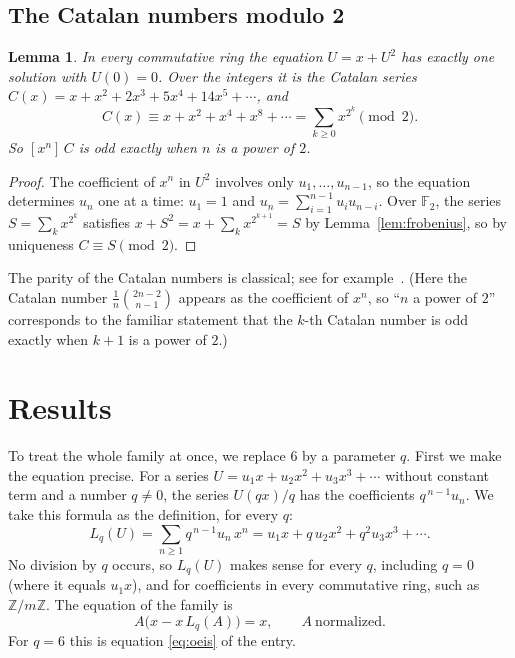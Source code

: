 \documentclass[11pt,a4paper]{article}
\newtheorem{lemma}[theorem]{Lemma}
\theoremstyle{definition}
\theoremstyle{remark}
\newcommand{\Z}{\mathbb{Z}}
\newcommand{\F}{\mathbb{F}}
\newcommand{\coeff}[2]{[x^{#1}]\,#2}
\begin{document}
\subsection{The Catalan numbers modulo 2}
\begin{lemma}\label{lem:catalan}
In every commutative ring the equation $U=x+U^2$ has exactly one solution with $U(0)=0$. Over the integers it is the
Catalan series $C(x)=x+x^2+2x^3+5x^4+14x^5+\cdots$, and
\[
C(x)\equiv x+x^2+x^4+x^8+\cdots=\sum_{k\ge0}x^{2^k}\pmod 2 .
\]
So $\coeff{n}{C}$ is odd exactly when $n$ is a power of $2$.
\end{lemma}

\begin{proof}
The coefficient of $x^n$ in $U^2$ involves only $u_1,\dots,u_{n-1}$, so the equation determines $u_n$ one at a time:
$u_1=1$ and $u_n=\sum_{i=1}^{n-1}u_iu_{n-i}$. Over $\F_2$, the series $S=\sum_kx^{2^k}$ satisfies
$x+S^2=x+\sum_kx^{2^{k+1}}=S$ by Lemma~\ref{lem:frobenius}, so by uniqueness $C\equiv S\pmod2$.
\end{proof}
The parity of the Catalan numbers is classical; see for example~\cite{deutschsagan}. (Here the Catalan number
$\frac1{n}\binom{2n-2}{n-1}$ appears as the coefficient of $x^n$, so ``$n$ a power of $2$'' corresponds to the familiar
statement that the $k$-th Catalan number is odd exactly when $k+1$ is a power of $2$.)


\section{Results}\label{sec:results}

To treat the whole family at once, we replace $6$ by a parameter $q$. First we make the equation
precise. For a series $U=u_1x+u_2x^2+u_3x^3+\cdots$ without constant term and a number $q\ne0$, the series $U(qx)/q$
has the coefficients $q^{\,n-1}u_n$. We take this formula as the definition, for every $q$:
\begin{equation}\label{eq:L}
L_q(U)=\sum_{n\ge1}q^{\,n-1}u_n\,x^n=u_1x+q\,u_2x^2+q^2u_3x^3+\cdots .
\end{equation}
No division by $q$ occurs, so $L_q(U)$ makes sense for every $q$, including $q=0$ (where it equals $u_1x$), and for
coefficients in every commutative ring, such as $\Z/m\Z$. The equation of the family is
\begin{equation}\label{eq:def}
A\bigl(x-x\,L_q(A)\bigr)=x,\qquad A\ \text{normalized}.
\end{equation}
For $q=6$ this is equation \eqref{eq:oeis} of the entry.
\end{document}
